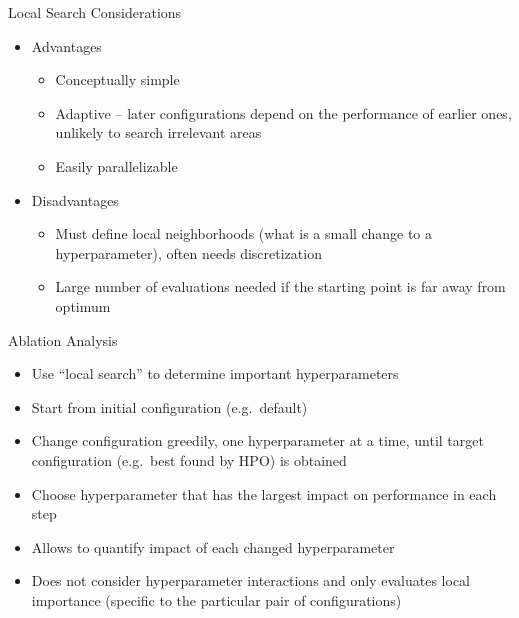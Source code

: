 \documentclass[main]{subfiles}
\begin{document}
\begin{frame}{Local Search Considerations}
    \begin{itemize}
        \item Advantages
            \begin{itemize}
                \item Conceptually simple
                \item Adaptive -- later configurations depend on the performance
                    of earlier ones, unlikely to search irrelevant areas
                \item Easily parallelizable
            \end{itemize}
        \item Disadvantages
            \begin{itemize}
                \item Must define local neighborhoods (what is a small change to a hyperparameter), often needs discretization
                \item Large number of evaluations needed if the starting point is
                    far away from optimum
            \end{itemize}
    \end{itemize}
\end{frame}


\begin{frame}{Ablation Analysis }
    \begin{itemize}
        \item Use ``local search'' to determine important hyperparameters
        \item Start from initial configuration (e.g.\ default)
        \item Change configuration greedily, one hyperparameter at a time, until target
            configuration (e.g.\ best found by HPO) is obtained
        \item Choose hyperparameter that has the largest impact on performance
            in each step
        \item Allows to quantify impact of each changed hyperparameter
        \item Does not consider hyperparameter interactions and only evaluates
            local importance (specific to the particular pair of configurations)
    \end{itemize}
\end{frame}
\end{document}
